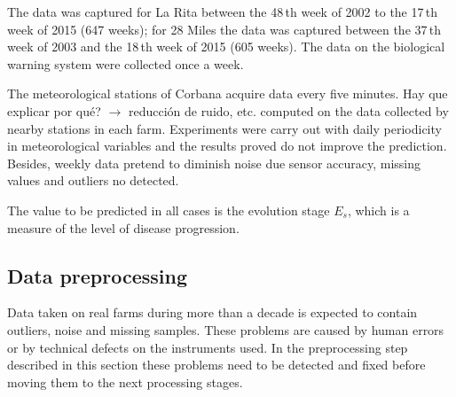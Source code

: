The data was captured for La Rita between the 48\,th week of
2002 to the 17\,th week of 2015 (647 weeks); for 28 Miles the
data was captured between the 37\,th week of 2003 and the
18\,th week of 2015 (605 weeks).
%
The data on the biological warning system were collected once a
week.

The meteorological stations of Corbana acquire data every five
minutes.
%
{Hay que explicar por qué? $\rightarrow$ reducción de ruido, etc.}
%
computed on the data collected by nearby stations in each farm. Experiments were carry out with daily periodicity in meteorological variables and the results proved do not improve the prediction. Besides, weekly data pretend to diminish noise due sensor accuracy, missing values and outliers no detected.




The value to be predicted in all cases is the evolution stage $E_s$,
which is a measure of the level of disease progression.

\subsection{Data preprocessing}

Data taken on real farms during more than a decade is expected to
contain outliers, noise and missing samples.  These problems are
caused by human errors or by technical defects on the instruments
used.  
%
In the preprocessing step described in this section these problems
need to be detected and fixed before moving them to the next
processing stages.


